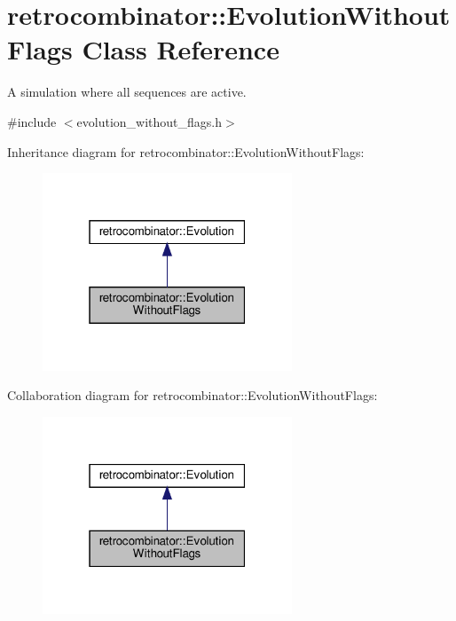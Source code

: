 \hypertarget{classretrocombinator_1_1EvolutionWithoutFlags}{}\section{retrocombinator\+:\+:Evolution\+Without\+Flags Class Reference}
\label{classretrocombinator_1_1EvolutionWithoutFlags}


A simulation where all sequences are active.  




{\ttfamily \#include $<$evolution\+\_\+without\+\_\+flags.\+h$>$}



Inheritance diagram for retrocombinator\+:\+:Evolution\+Without\+Flags\+:
\nopagebreak
\begin{figure}[H]
\begin{center}
\leavevmode
\includegraphics[width=211pt]{classretrocombinator_1_1EvolutionWithoutFlags__inherit__graph}
\end{center}
\end{figure}


Collaboration diagram for retrocombinator\+:\+:Evolution\+Without\+Flags\+:
\nopagebreak
\begin{figure}[H]
\begin{center}
\leavevmode
\includegraphics[width=211pt]{classretrocombinator_1_1EvolutionWithoutFlags__coll__graph}
\end{center}
\end{figure}
